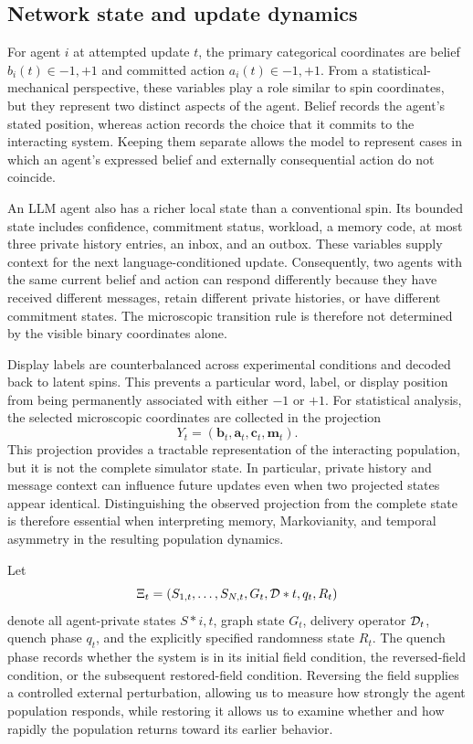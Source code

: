 \documentclass[12pt]{article}
\begin{document}
\subsection{Network state and update dynamics}
\label{sec:state}

For agent $i$ at attempted update $t$, the primary categorical coordinates are
belief $b_i(t)\in{-1,+1}$ and committed action
$a_i(t)\in{-1,+1}$. From a statistical-mechanical perspective, these
variables play a role similar to spin coordinates, but they represent two
distinct aspects of the agent. Belief records the agent's stated position,
whereas action records the choice that it commits to the interacting system.
Keeping them separate allows the model to represent cases in which an agent's
expressed belief and externally consequential action do not coincide.

An LLM agent also has a richer local state than a conventional spin. Its
bounded state includes confidence, commitment status, workload, a memory code,
at most three private history entries, an inbox, and an outbox. These variables
supply context for the next language-conditioned update. Consequently, two
agents with the same current belief and action can respond differently because
they have received different messages, retain different private histories, or
have different commitment states. The microscopic transition rule is therefore
not determined by the visible binary coordinates alone.

Display labels are counterbalanced across experimental conditions and decoded
back to latent spins. This prevents a particular word, label, or display
position from being permanently associated with either $-1$ or $+1$. For
statistical analysis, the selected microscopic coordinates are collected in
the projection
\begin{equation}
Y_t=(\bm b_t,\bm a_t,\bm c_t,\bm m_t).
\end{equation}
This projection provides a tractable representation of the interacting
population, but it is not the complete simulator state. In particular, private
history and message context can influence future updates even when two
projected states appear identical. Distinguishing the observed projection from
the complete state is therefore essential when interpreting memory,
Markovianity, and temporal asymmetry in the resulting population dynamics.


Let
\begin{equation}
\Xi_t=(S_{1,t},\ldots,S_{N,t},G_t,{\cal D}*t,q_t,R_t)
\end{equation}
denote all agent-private states $S*{i,t}$, graph state $G_t$, delivery operator
${\cal D}_t$, quench phase $q_t$, and the explicitly specified randomness
state $R_t$. The quench phase records whether the system is in its initial
field condition, the reversed-field condition, or the subsequent
restored-field condition. Reversing the field supplies a controlled external
perturbation, allowing us to measure how strongly the agent population
responds, while restoring it allows us to examine whether and how rapidly the
population returns toward its earlier behavior.
\end{document}
